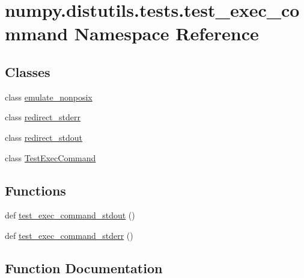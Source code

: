 \hypertarget{namespacenumpy_1_1distutils_1_1tests_1_1test__exec__command}{}\section{numpy.\+distutils.\+tests.\+test\+\_\+exec\+\_\+command Namespace Reference}
\label{namespacenumpy_1_1distutils_1_1tests_1_1test__exec__command}
\subsection*{Classes}
\begin{DoxyCompactItemize}
\item 
class \hyperlink{classnumpy_1_1distutils_1_1tests_1_1test__exec__command_1_1emulate__nonposix}{emulate\+\_\+nonposix}
\item 
class \hyperlink{classnumpy_1_1distutils_1_1tests_1_1test__exec__command_1_1redirect__stderr}{redirect\+\_\+stderr}
\item 
class \hyperlink{classnumpy_1_1distutils_1_1tests_1_1test__exec__command_1_1redirect__stdout}{redirect\+\_\+stdout}
\item 
class \hyperlink{classnumpy_1_1distutils_1_1tests_1_1test__exec__command_1_1TestExecCommand}{Test\+Exec\+Command}
\end{DoxyCompactItemize}
\subsection*{Functions}
\begin{DoxyCompactItemize}
\item 
def \hyperlink{namespacenumpy_1_1distutils_1_1tests_1_1test__exec__command_accbc1be7cee6f0e40b204949ae0448d9}{test\+\_\+exec\+\_\+command\+\_\+stdout} ()
\item 
def \hyperlink{namespacenumpy_1_1distutils_1_1tests_1_1test__exec__command_a767ae70a82f8569cb4484d3303265910}{test\+\_\+exec\+\_\+command\+\_\+stderr} ()
\end{DoxyCompactItemize}


\subsection{Function Documentation}
\mbox{\label{namespacenumpy_1_1distutils_1_1tests_1_1test__exec__command_a767ae70a82f8569cb4484d3303265910}} 

